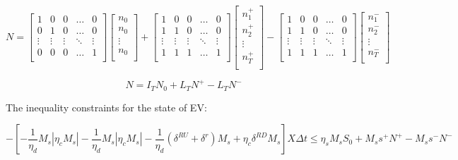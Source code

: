 \[
N = 
\begin{bmatrix}
1& 0 & 0 & \dots & 0 \\
0& 1 & 0 & \dots & 0 \\
\vdots & \vdots & \vdots & \ddots & \vdots \\
0& 0 & 0 & \dots & 1 \\
\end{bmatrix}
\begin{bmatrix}
n_0 \\
n_0 \\
\vdots \\
n_0 \\
\end{bmatrix}
+
\begin{bmatrix}
1& 0 & 0 & \dots & 0 \\
1& 1 & 0 & \dots & 0 \\
\vdots & \vdots & \vdots & \ddots & \vdots \\
1& 1 & 1 & \dots & 1 \\
\end{bmatrix}
\begin{bmatrix}
n_1^+ \\
n_2^+  \\
\vdots \\
n_T^+  \\
\end{bmatrix}
-
\begin{bmatrix}
1& 0 & 0 & \dots & 0 \\
1& 1 & 0 & \dots & 0 \\
\vdots & \vdots & \vdots & \ddots & \vdots \\
1& 1 & 1 & \dots & 1 \\
\end{bmatrix}
\begin{bmatrix}
n_1^-  \\
n_2^- \\
\vdots \\
n_T^- \\
\end{bmatrix}
\]

\begin{equation*}
N = I_T N_0 + L_T N^+ - L_T N^-
\end{equation*}



The inequality constraints for the state of EV:

\begin{equation*}
- [-\frac{1}{\eta_d}M_s | \eta_c M_s | -\frac{1}{\eta_d}M_s | \eta_c M_s | -\frac{1}{\eta_d}  (\delta^{RU} + \delta^r) M_s + \eta_c \delta^{RD} M_s ] X \Delta t \leq \eta_s M_s S_0 + M_s s^+ N^+ - M_s s^- N^-
\end{equation*}

